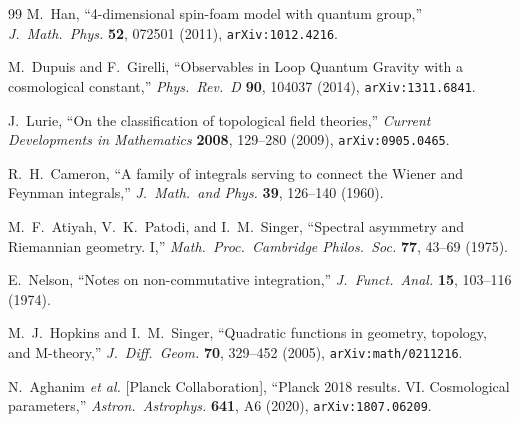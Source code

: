 \documentclass[11pt,a4paper]{article}
\theoremstyle{plain}
\theoremstyle{definition}
\theoremstyle{remark}
\begin{document}
\begin{thebibliography}{99}
M.~Han, ``4-dimensional spin-foam model with quantum group,'' \emph{J.\ Math.\ Phys.} \textbf{52}, 072501 (2011), \texttt{arXiv:1012.4216}.

M.~Dupuis and F.~Girelli, ``Observables in Loop Quantum Gravity with a cosmological constant,'' \emph{Phys.\ Rev.\ D} \textbf{90}, 104037 (2014), \texttt{arXiv:1311.6841}.

J.~Lurie, ``On the classification of topological field theories,'' \emph{Current Developments in Mathematics} \textbf{2008}, 129--280 (2009), \texttt{arXiv:0905.0465}.

R.~H.~Cameron, ``A family of integrals serving to connect the Wiener and Feynman integrals,'' \emph{J.\ Math.\ and Phys.} \textbf{39}, 126--140 (1960).

M.~F.~Atiyah, V.~K.~Patodi, and I.~M.~Singer, ``Spectral asymmetry and Riemannian geometry. I,'' \emph{Math.\ Proc.\ Cambridge Philos.\ Soc.} \textbf{77}, 43--69 (1975).

E.~Nelson, ``Notes on non-commutative integration,'' \emph{J.\ Funct.\ Anal.} \textbf{15}, 103--116 (1974).

M.~J.~Hopkins and I.~M.~Singer, ``Quadratic functions in geometry, topology, and M-theory,'' \emph{J.\ Diff.\ Geom.} \textbf{70}, 329--452 (2005), \texttt{arXiv:math/0211216}.

N.~Aghanim \emph{et al.} [Planck Collaboration], ``Planck 2018 results. VI. Cosmological parameters,'' \emph{Astron.\ Astrophys.} \textbf{641}, A6 (2020), \texttt{arXiv:1807.06209}.

\end{thebibliography}
\end{document}
